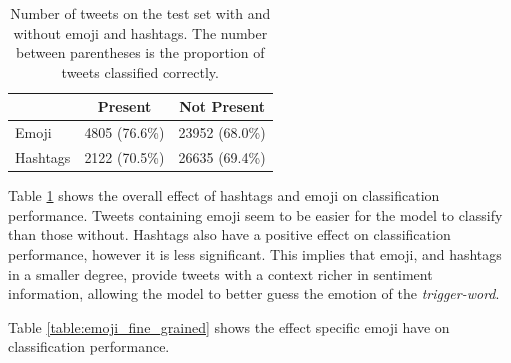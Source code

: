 \documentclass[11pt,a4paper]{article}
\begin{document}
\begin{table}[!h]
    \centering
    \footnotesize

    \begin{tabular}{lcc}

        \textbf{} & \textbf{Present} & \textbf{Not Present} \\
        \hline
        \hline
        Emoji     & 4805 (76.6\%)    & 23952 (68.0\%)       \\
        Hashtags  & 2122 (70.5\%)    & 26635 (69.4\%)       \\

    \end{tabular}

    \caption{Number of tweets on the test set with and without emoji and
    hashtags. The number between parentheses is the proportion of tweets
    classified correctly.}

    \label{table:emoji_and_hashtags}

\end{table}

Table \ref{table:emoji_and_hashtags} shows the overall effect of hashtags and
emoji on classification performance. Tweets containing emoji seem to be easier
for the model to classify than those without. Hashtags also have a positive
effect on classification performance, however it is less significant. This
implies that emoji, and hashtags in a smaller degree, provide tweets with a
context richer in sentiment information, allowing the model to better guess the
emotion of the \textit{trigger-word}.

Table \ref{table:emoji_fine_grained} shows the effect specific emoji have on
classification performance. 
\end{document}
